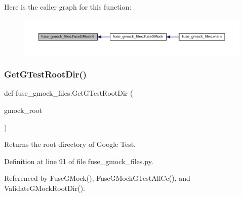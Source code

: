 Here is the caller graph for this function\+:
\nopagebreak
\begin{figure}[H]
\begin{center}
\leavevmode
\includegraphics[width=350pt]{namespacefuse__gmock__files_abab451606f671f59404f23276aad2c34_icgraph}
\end{center}
\end{figure}
\mbox{\label{namespacefuse__gmock__files_aae591d77d2d969394996f9fc2017824c}} 
\subsubsection{\texorpdfstring{Get\+G\+Test\+Root\+Dir()}{GetGTestRootDir()}}
{\footnotesize\ttfamily def fuse\+\_\+gmock\+\_\+files.\+Get\+G\+Test\+Root\+Dir (\begin{DoxyParamCaption}\item[{}]{gmock\+\_\+root }\end{DoxyParamCaption})}

\begin{DoxyVerb}Returns the root directory of Google Test.\end{DoxyVerb}
 

Definition at line 91 of file fuse\+\_\+gmock\+\_\+files.\+py.



Referenced by Fuse\+G\+Mock(), Fuse\+G\+Mock\+G\+Test\+All\+Cc(), and Validate\+G\+Mock\+Root\+Dir().


